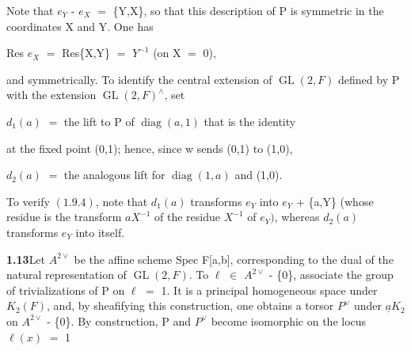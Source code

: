 \documentclass[10pt,a4paper]{article}
\begin{document}
\par Note that $e_Y$ - $e_X$ $=$ \{Y,X\}, so that this description of P is symmetric in the coordinates X and Y. One has\par
\par\smallskip\begin{center}\begin{minipage}{0.96\textwidth}\centering
Res $e_X$ $=$ Res\{X,Y\} $=$ $Y^{-1}$ (on X $=$ 0),
\end{minipage}\end{center}\smallskip
\par and symmetrically. To identify the central extension of $\operatorname{GL}(2,F)$ defined by P with the extension $\operatorname{GL}(2,F)^\wedge{}$, set\par
\par\smallskip\begin{center}\begin{minipage}{0.96\textwidth}\centering
$d_1(a)$ $=$ the lift to P of $\operatorname{diag}(a,1)$ that is the identity
\end{minipage}\end{center}\smallskip
\par at the fixed point (0,1); hence, since w sends (0,1) to (1,0),\par
\par\smallskip\begin{center}\begin{minipage}{0.96\textwidth}\centering
$d_2(a)$ $=$ the analogous lift for $\operatorname{diag}(1,a)$ and (1,0).
\end{minipage}\end{center}\smallskip
\par To verify $(1.9.4)$, note that $d_1(a)$ transforms $e_Y$ into $e_Y$ + \{a,Y\} (whose residue is the transform $aX^{-1}$ of the residue $X^{-1}$ of $e_Y)$, whereas $d_2(a)$ transforms $e_Y$ into itself.\par
\par\noindent\textbf{1.13}\quad Let $A^{2\vee{}}$ be the affine scheme Spec F[a,b], corresponding to the dual of the natural representation of $\operatorname{GL}(2,F)$. To $\ell{}$ $\in{}$ $A^{2\vee{}}$ - \{0\}, associate the group of trivializations of P on $\ell{}$ $=$ 1. It is a principal homogeneous space under $K_2(F)$, and, by sheafifying this construction, one obtains a torsor $P^\vee{}$ under $\underline{a}K_2$ on $A^{2\vee{}}$ - \{0\}. By construction, P and $P^\vee{}$ become isomorphic on the locus $\ell{}(x)$ $=$ 1\par
\end{document}
